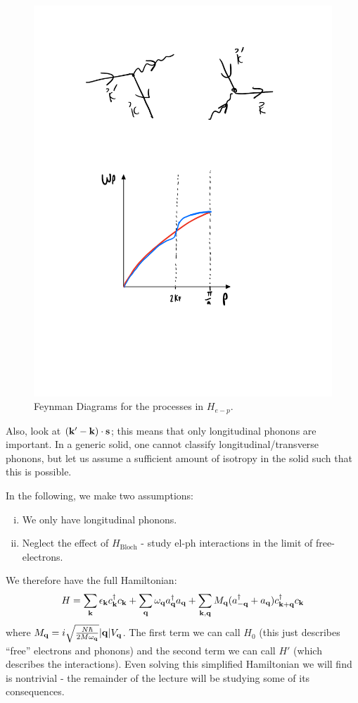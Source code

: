 \begin{figure}[htbp]
    \centering
    \includegraphics[scale=0.5]{Images/fig-elphfeynman.pdf}
    \caption{Feynman Diagrams for the processes in $H_{e-p}$.}
    \label{fig-elphfeynman}
\end{figure}

Also, look at $(\mathbf{k}' - \mathbf{k})\cdot \mathbf{s}$; this means that only longitudinal phonons are important. In a generic solid, one cannot classify longitudinal/transverse phonons, but let us assume a sufficient amount of isotropy in the solid such that this is possible.

In the following, we make two assumptions:
\begin{enumerate}[(i)]
    \item We only have longitudinal phonons.
    \item Neglect the effect of $H_{\text{Bloch}}$ - study el-ph interactions in the limit of free-electrons.
\end{enumerate}
We therefore have the full Hamiltonian:
\begin{equation}
    H = \sum_{\mathbf{k}}\epsilon_{\mathbf{k}}c^\dagger_{\mathbf{k}}c_{\mathbf{k}} + \sum_{\mathbf{q}}\omega_{\mathbf{q}}a^\dagger_{\mathbf{q}}a_{\mathbf{q}} + \sum_{\mathbf{k}, \mathbf{q}} M_{\mathbf{q}}(a^\dagger_{-\mathbf{q}} + a_{\mathbf{q}})c^\dagger_{\mathbf{k} + \mathbf{q}}c_{\mathbf{k}}
\end{equation}
where $M_{\mathbf{q}} = i \sqrt{\frac{N\hbar}{2M\omega_{\mathbf{q}}}}\lvert \mathbf{q} \rvert V_{\mathbf{q}}$. The first term we can call $H_0$ (this just describes ``free'' electrons and phonons) and the second term we can call $H'$ (which describes the interactions). Even solving this simplified Hamiltonian we will find is nontrivial - the remainder of the lecture will be studying some of its consequences.

